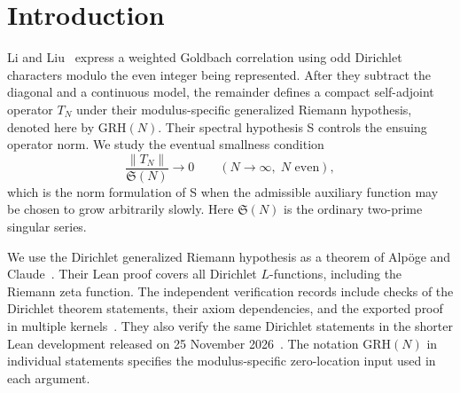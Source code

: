 \documentclass[11pt,a4paper]{article}
\numberwithin{equation}{section}
\newcommand{\SSS}{\mathfrak S}
\newcommand{\grh}{\mathrm{GRH}}
\begin{document}
\begin{abstract}
this range by $Y^{1/2}$ times a log power for even
$N\in[Y,2Y]$. For $x,y\le N^{1+\eta}$ the sum is
$O_{\eta,\varepsilon}(Y^{1/2+3\eta/2+\varepsilon})$
when $0<\eta<1/3$. For inputs above
$N^\delta$, the power saving holds through the exact product
cutoff $xy\le N^{2+\gamma}$ for $0<\gamma<\delta/2$ and
every fixed $0<\delta<1$.
For even moduli with the two divisors specified in Section~13,
Dirichlet GRH gives mean-square decay with arbitrary test supports
uniformly over sharp caps from $N^2$ to $N^2(\log N)^B$.
At each modulus, all but $O(\log N\log\log N)$ proper prime
powers can be removed from the arithmetic form while preserving
the full-norm smallness criterion.
The remaining progression terms vanish through $N^2(\log N)^B$
for fixed inputs at almost all moduli. They also vanish for
polylogarithmic inputs on a family of positive lower density.
We certify two-sided norm bounds at five balanced moduli and for
three separated rectangular restrictions. A rational test gives
$\|T_{32762}\|>0.2485744893$ in the original normalization.
The asymptotic estimate for the full operator remains open.
It would imply that the proportion of odd characters with
nonzero central value tends to one through the even moduli.
\end{abstract}

\section{Introduction}

Li and Liu~\cite{LiLiu} express a weighted Goldbach correlation using odd
Dirichlet characters modulo the even integer being represented. After they
subtract the diagonal and a continuous model, the remainder defines a compact
self-adjoint operator $T_N$ under their modulus-specific generalized Riemann
hypothesis, denoted here by $\grh(N)$. Their spectral hypothesis S controls
the ensuing operator norm. We study the eventual smallness condition
\begin{equation}
  \frac{\|T_N\|}{\SSS(N)}\longrightarrow 0
  \qquad (N\to\infty,\;N\text{ even}),
  \label{eq:goal}
\end{equation}
which is the norm formulation of S when the admissible auxiliary function
may be chosen to grow arbitrarily slowly. Here $\SSS(N)$ is the ordinary
two-prime singular series.

We use the Dirichlet generalized Riemann hypothesis as a theorem
of Alp\"oge and Claude~\cite{AlpogeGRH}. Their Lean proof covers
all Dirichlet $L$-functions, including the Riemann zeta function.
The independent verification records include checks of the
Dirichlet theorem statements, their axiom dependencies, and
the exported proof in multiple kernels~\cite{SutherlandGRH,RubinsteinGRH}.
They also verify the same Dirichlet statements in the shorter
Lean development released on 25 November 2026~\cite{ShortGRH}.
The notation $\grh(N)$ in individual statements specifies the
modulus-specific zero-location input used in each argument.
\end{document}
